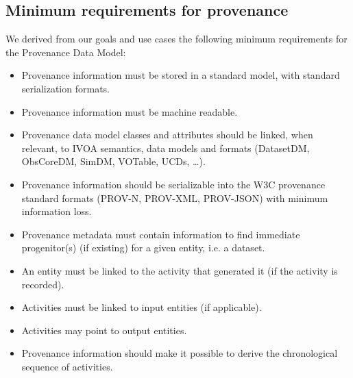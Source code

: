 \subsection{Minimum requirements for provenance}\label{sec:requirements}

We derived from our goals and use cases the following minimum requirements for the Provenance Data Model:

\begin{itemize}



\item Provenance information must be stored in a standard model, with standard serialization formats.

\item Provenance information must be machine readable.

\item Provenance data model classes and attributes should be linked, when relevant, to IVOA semantics, data models and formats (DatasetDM, ObsCoreDM, SimDM, VOTable, UCDs, \ldots).

\item Provenance information should be serializable into the W3C provenance standard formats (PROV-N, PROV-XML, PROV-JSON) with minimum information loss.



\item Provenance metadata must contain information to find immediate progenitor(s) (if existing) for a given entity, i.e. a dataset.


\item An entity must be linked to the activity that generated it (if the activity is recorded).

\item Activities must be linked to input entities (if applicable).

\item Activities may point to output entities.

\item Provenance information should make it possible to derive the chronological sequence of activities.

\end{itemize}

